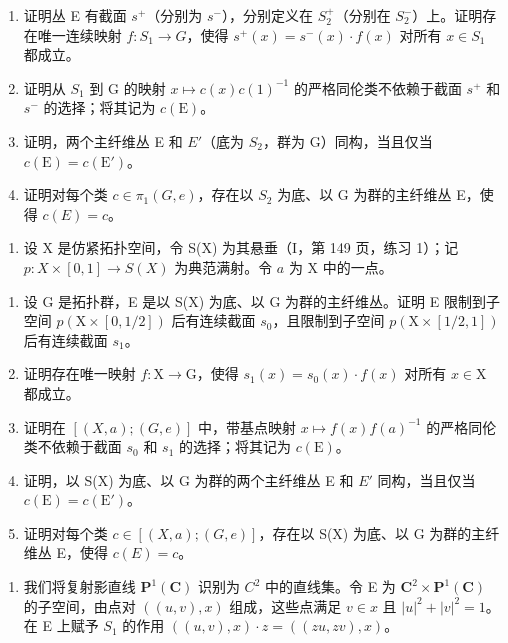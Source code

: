 \begin{enumerate}
\def\labelenumi{\alph{enumi})}
\item
  证明丛 E 有截面 \(s^{+}\)（分别为 \(s^{-}\)），分别定义在 \(S_{2}^{+}\)（分别在 \(S_{2}^{-}\)）上。证明存在唯一连续映射 \(f\colon S_{1}\to G\)，使得 \(s^{+}(x)=s^{-}(x)\cdot f(x)\) 对所有 \(x\in S_{1}\) 都成立。
\item
  证明从 \(S_{1}\) 到 G 的映射 \(x \mapsto c(x)c(1)^{-1}\) 的严格同伦类不依赖于截面 \(s^{+}\) 和 \(s^{-}\) 的选择；将其记为 \(c(\mathrm{E})\)。
\item
  证明，两个主纤维丛 E 和 \(E'\)（底为 \(S_{2}\)，群为 G）同构，当且仅当 \(c(\mathrm{E}) = c(\mathrm{E}')\)。
\item
  证明对每个类 \(c \in \pi_{1}(G, e)\)，存在以 \(S_{2}\) 为底、以 G 为群的主纤维丛 E，使得 \(c(E) = c\)。
\end{enumerate}

\begin{enumerate}
\def\labelenumi{\arabic{enumi})}
\setcounter{enumi}{7}
\tightlist
\item
  设 X 是仿紧拓扑空间，令 S(X) 为其悬垂（I，第 149 页，练习 1）；记 \(p\colon X \times [0,1] \to S(X)\) 为典范满射。令 \(a\) 为 X 中的一点。
\end{enumerate}

\begin{enumerate}
\def\labelenumi{\alph{enumi})}
\item
  设 G 是拓扑群，E 是以 S(X) 为底、以 G 为群的主纤维丛。证明 E 限制到子空间 \(p(\mathrm{X} \times [0,1/2])\) 后有连续截面 \(s_{0}\)，且限制到子空间 \(p(\mathrm{X} \times [1/2,1])\) 后有连续截面 \(s_{1}\)。
\item
  证明存在唯一映射 \(f\colon \mathrm{X}\to \mathrm{G}\)，使得 \(s_1(x) = s_0(x)\cdot f(x)\) 对所有 \(x\in \mathrm{X}\) 都成立。
\item
  证明在 \([(X,a);(G,e)]\) 中，带基点映射 \(x \mapsto f(x)f(a)^{-1}\) 的严格同伦类不依赖于截面 \(s_{0}\) 和 \(s_{1}\) 的选择；将其记为 \(c(\mathrm{E})\)。
\item
  证明，以 S(X) 为底、以 G 为群的两个主纤维丛 E 和 \(E'\) 同构，当且仅当 \(c(\mathrm{E}) = c(\mathrm{E}')\)。
\item
  证明对每个类 \(c \in [(X, a); (G, e)]\)，存在以 S(X) 为底、以 G 为群的主纤维丛 E，使得 \(c(E) = c\)。
\end{enumerate}

\begin{enumerate}
\def\labelenumi{\arabic{enumi})}
\setcounter{enumi}{8}
\tightlist
\item
  我们将复射影直线 \(\mathbf{P}^{1}(\mathbf{C})\) 识别为 \(C^{2}\) 中的直线集。令 E 为 \(\mathbf{C}^{2} \times \mathbf{P}^{1}(\mathbf{C})\) 的子空间，由点对 \(((u, v), x)\) 组成，这些点满足 \(v \in x\) 且 \(|u|^{2} + |v|^{2} = 1\)。在 E 上赋予 \(S_{1}\) 的作用 \(((u, v), x) \cdot z = ((zu, zv), x)\)。
\end{enumerate}

